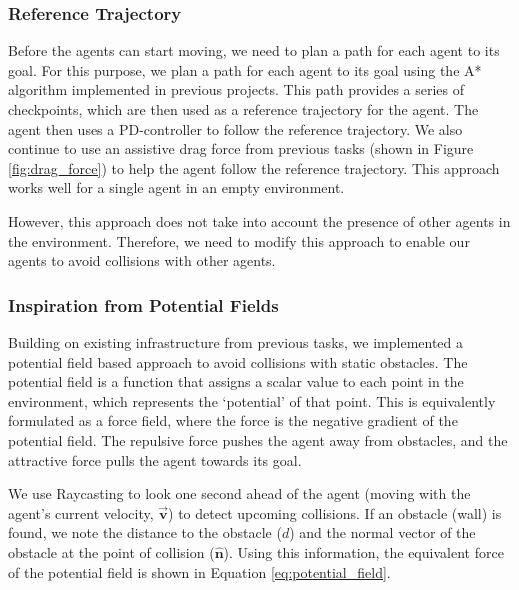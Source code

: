 \documentclass[a4paper,12pt]{article}
\begin{document}
\subsubsection{Reference Trajectory}
\label{method_collision_reference}
Before the agents can start moving, we need to plan a path for each agent to its goal. For this purpose, we plan a path for each agent to its goal using the A* algorithm implemented in previous projects. This path provides a series of checkpoints, which are then used as a reference trajectory for the agent. The agent then uses a PD-controller to follow the reference trajectory. We also continue to use an assistive drag force from previous tasks (shown in Figure \ref{fig:drag_force}) to help the agent follow the reference trajectory. This approach works well for a single agent in an empty environment.




However, this approach does not take into account the presence of other agents in the environment. Therefore, we need to modify this approach to enable our agents to avoid collisions with other agents.

\subsubsection{Inspiration from Potential Fields}
\label{method_collision_potential}
Building on existing infrastructure from previous tasks, we implemented a potential field based approach to avoid collisions with static obstacles. The potential field is a function that assigns a scalar value to each point in the environment, which represents the `potential' of that point. This is equivalently formulated as a force field, where the force is the negative gradient of the potential field. The repulsive force pushes the agent away from obstacles, and the attractive force pulls the agent towards its goal. 

We use Raycasting to look one second ahead of the agent (moving with the agent's current velocity, $\overrightarrow{\mathbf{v}}$) to detect upcoming collisions. If an obstacle (wall) is found, we note the distance to the obstacle ($d$) and the normal vector of the obstacle at the point of collision ($\hat{\mathbf{n}}$). Using this information, the equivalent force of the potential field is shown in Equation \ref{eq:potential_field}.
\end{document}
